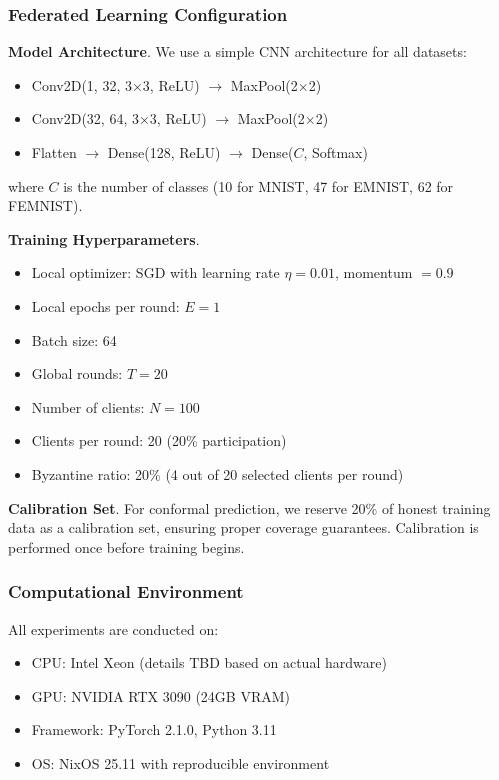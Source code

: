 \subsubsection{Federated Learning Configuration}

\textbf{Model Architecture}. We use a simple CNN architecture for all datasets:
\begin{itemize}[leftmargin=*,noitemsep]
    \item Conv2D(1, 32, 3×3, ReLU) $\rightarrow$ MaxPool(2×2)
    \item Conv2D(32, 64, 3×3, ReLU) $\rightarrow$ MaxPool(2×2)
    \item Flatten $\rightarrow$ Dense(128, ReLU) $\rightarrow$ Dense($C$, Softmax)
\end{itemize}
where $C$ is the number of classes (10 for MNIST, 47 for EMNIST, 62 for FEMNIST).

\textbf{Training Hyperparameters}.
\begin{itemize}[leftmargin=*,noitemsep]
    \item Local optimizer: SGD with learning rate $\eta = 0.01$, momentum $= 0.9$
    \item Local epochs per round: $E = 1$
    \item Batch size: 64
    \item Global rounds: $T = 20$
    \item Number of clients: $N = 100$
    \item Clients per round: 20 (20\% participation)
    \item Byzantine ratio: 20\% (4 out of 20 selected clients per round)
\end{itemize}

\textbf{Calibration Set}. For conformal prediction, we reserve 20\% of honest training data as a calibration set, ensuring proper coverage guarantees. Calibration is performed once before training begins.

\subsubsection{Computational Environment}

All experiments are conducted on:
\begin{itemize}[leftmargin=*,noitemsep]
    \item CPU: Intel Xeon (details TBD based on actual hardware)
    \item GPU: NVIDIA RTX 3090 (24GB VRAM)
    \item Framework: PyTorch 2.1.0, Python 3.11
    \item OS: NixOS 25.11 with reproducible environment
\end{itemize}

